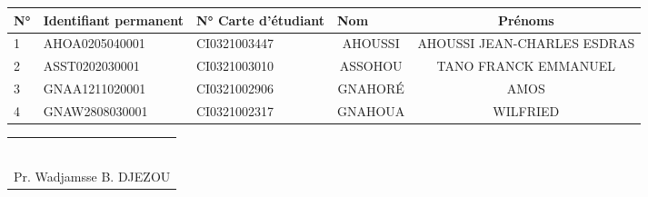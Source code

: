 \documentclass[12pt,a4paper, openany]{book}
\begin{document}
	\begin{longtable}{|p{}|p{}|p{}|p{}|p{}|}
		\hline 
		\centering \textbf{N°}&
		\centering \textbf{Identifiant permanent}&
		\centering \textbf{N° Carte d’étudiant}&
		\centering \textbf{Nom} &
		\multicolumn{1}{c|}{\textbf{Prénoms}}\\ \hline \hline
		\endhead %
		1&  AHOA0205040001& CI0321003447&  \multicolumn{1}{c|}{AHOUSSI}& \multicolumn{1}{c|}{AHOUSSI JEAN-CHARLES ESDRAS}\\ \hline 
		2&  ASST0202030001& CI0321003010&  \multicolumn{1}{c|}{ASSOHOU}& \multicolumn{1}{c|}{TANO FRANCK EMMANUEL}\\ \hline
		3&  GNAA1211020001& CI0321002906&  \multicolumn{1}{c|}{GNAHOR\'E}& \multicolumn{1}{c|}{AMOS}\\ \hline
		4&  GNAW2808030001& CI0321002317&  \multicolumn{1}{c|}{GNAHOUA}& \multicolumn{1}{c|}{WILFRIED}\\ \hline
	\end{longtable}
	\begin{longtable}{p{\textwidth}}
		\\
		\\
		\\
		\\
		\\
		\\
		\\
		\centering Pr. Wadjamsse B. DJEZOU
	\end{longtable}

	
	
\end{document}
